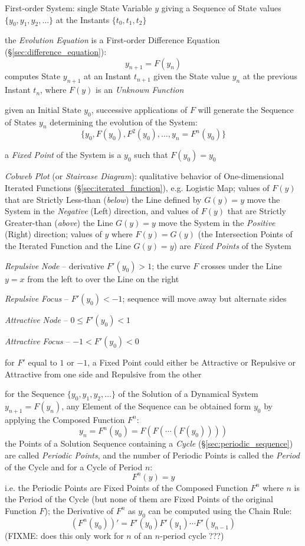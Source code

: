First-order System: single State Variable $y$ giving a Sequence of State values
$\{y_0, y_1, y_2, \ldots\}$ at the Instants $\{t_0, t_1, t_2\}$

the \emph{Evolution Equation} is a First-order Difference Equation
(\S\ref{sec:difference_equation}):
\[
  y_{n+1} = F(y_n)
\]
computes State $y_{n+1}$ at an Instant $t_{n+1}$ given the State value $y_n$ at
the previous Instant $t_n$, where $F(y)$ is an \emph{Unknown Function}

given an Initial State $y_0$, successive applications of $F$ will generate the
Sequence of States $y_n$ determining the evolution of the System:
\[
  \{ y_0, F(y_0), F^2(y_0), \ldots, y_n = F^n(y_0) \}
\]

a \emph{Fixed Point} of the System is a $y_0$ such that $F(y_0) = y_0$

\emph{Cobweb Plot} (or \emph{Staircase Diagram}): qualitative behavior of
One-dimensional Iterated Functions (\S\ref{sec:iterated_function}), e.g.
Logistic Map; values of $F(y)$ that are Strictly Less-than (\emph{below}) the
Line defined by $G(y) = y$ move the System in the \emph{Negative} (Left)
direction, and values of $F(y)$ that are Strictly Greater-than (\emph{above})
the Line $G(y) = y$ move the System in the \emph{Positive} (Right) direction;
values of $y$ where $F(y) = G(y)$ (the Intersection Points of the Iterated
Function and the Line $G(y) = y$) are \emph{Fixed Points} of the System

\emph{Repulsive Node} -- derivative $F'(y_0) > 1$; the curve $F$ crosses under
the Line $y=x$ from the left to over the Line on the right

\emph{Repulsive Focus} -- $F'(y_0) < -1$; sequence will move
away but alternate sides

\emph{Attractive Node} -- $0 \leq F'(y_0) < 1$

\emph{Attractive Focus} -- $-1 < F'(y_0) < 0$

for $F'$ equal to $1$ or $-1$, a Fixed Point could either be Attractive or
Repulsive or Attractive from one side and Repulsive from the other

for the Sequence $\{ y_0, y_1, y_2, \ldots \}$ of the Solution of a Dynamical
System $y_{n+1} = F(y_n)$, any Element of the Sequence can be obtained form
$y_0$ by applying the Composed Function $F^n$:
\[
  y_n = F^n(y_0) = F(F(\cdots(F(y_0))))
\]
the Points of a Solution Sequence containing a \emph{Cycle}
(\S\ref{sec:periodic_sequence}) are called \emph{Periodic Points}, and the
number of Periodic Points is called the \emph{Period} of the Cycle and for
a Cycle of Period $n$:
\[
  F^n(y) = y
\]
i.e. the Periodic Points are Fixed Points of the Composed Function $F^n$ where
$n$ is the Period of the Cycle (but none of them are Fixed Points of the
original Function $F$);
the Derivative of $F^n$ as $y_0$ can be computed using the Chain Rule:
\[
  (F^n(y_0))' = F'(y_0)F'(y_1)\cdots{F'(y_{n-1})}
\]
(FIXME: does this only work for $n$ of an $n$-period cycle ???)

